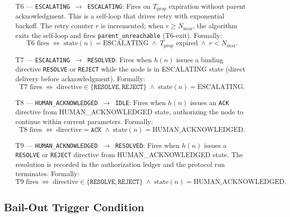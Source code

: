 \begin{enumerate}
\item[T6 --- \texttt{ESCALATING $\rightarrow$ ESCALATING}:] Fires on $T_{\text{prop}}$ expiration without parent acknowledgment. This is a self-loop that drives retry with exponential backoff. The retry counter $r$ is incremented; when $r \geq N_{\max}$, the algorithm exits the self-loop and fires \texttt{parent\_unreachable} (T6-exit). Formally:
\begin{equation}
\text{T6 fires} \;\iff\; \text{state}(n) = \text{ESCALATING} \;\land\; T_{\text{prop}}\text{ expired} \;\land\; r < N_{\max}. \tag{T6}
\end{equation}

\item[T7 --- \texttt{ESCALATING $\rightarrow$ RESOLVED}:] Fires when $h(n)$ issues a binding directive \texttt{RESOLVE} or \texttt{REJECT} while the node is in ESCALATING state (direct delivery before acknowledgment). Formally:
\begin{equation}
\text{T7 fires} \;\iff\; \text{directive} \in \{\texttt{RESOLVE}, \texttt{REJECT}\} \;\land\; \text{state}(n) = \text{ESCALATING}. \tag{T7}
\end{equation}

\item[T8 --- \texttt{HUMAN\_ACKNOWLEDGED $\rightarrow$ IDLE}:] Fires when $h(n)$ issues an \texttt{ACK} directive from HUMAN\_ACKNOWLEDGED state, authorizing the node to continue within current parameters. Formally:
\begin{equation}
\text{T8 fires} \;\iff\; \text{directive} = \texttt{ACK} \;\land\; \text{state}(n) = \text{HUMAN\_ACKNOWLEDGED}. \tag{T8}
\end{equation}

\item[T9 --- \texttt{HUMAN\_ACKNOWLEDGED $\rightarrow$ RESOLVED}:] Fires when $h(n)$ issues a \texttt{RESOLVE} or \texttt{REJECT} directive from HUMAN\_ACKNOWLEDGED state. The resolution is recorded in the authorization ledger and the protocol run terminates. Formally:
\begin{equation}
\text{T9 fires} \;\iff\; \text{directive} \in \{\texttt{RESOLVE}, \texttt{REJECT}\} \;\land\; \text{state}(n) = \text{HUMAN\_ACKNOWLEDGED}. \tag{T9}
\end{equation}
\end{enumerate}

\subsection{Bail-Out Trigger Condition}\label{sec:bailout-trigger}

